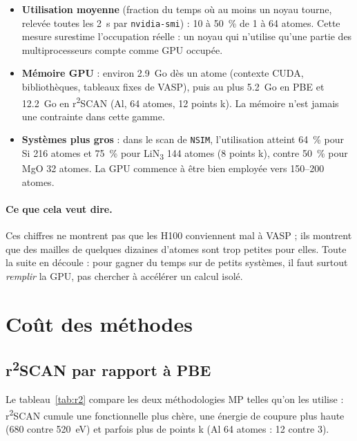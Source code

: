 \documentclass[11pt,a4paper]{article}
\newcommand{\rscan}{r\textsuperscript{2}SCAN}
\begin{document}
\begin{itemize}
  \item \textbf{Utilisation moyenne} (fraction du temps où au moins un noyau tourne, relevée
        toutes les \SI{2}{s} par \texttt{nvidia-smi}) : 10 à \SI{50}{\percent} de 1 à 64 atomes.
        Cette mesure surestime l'occupation réelle : un noyau qui n'utilise qu'une partie des
        multiprocesseurs compte comme \og GPU occupée\fg.
  \item \textbf{Mémoire GPU} : environ \SI{2,9}{Go} dès un atome (contexte CUDA, bibliothèques,
        tableaux fixes de VASP), puis au plus \SI{5,2}{Go} en PBE et \SI{12,2}{Go} en \rscan{}
        (Al, 64 atomes, 12 points k). La mémoire n'est jamais une contrainte dans cette gamme.
  \item \textbf{Systèmes plus gros} : dans le scan de \texttt{NSIM}, l'utilisation atteint
        \SI{64}{\percent} pour Si 216 atomes et \SI{75}{\percent} pour LiN\textsubscript{3}
        144 atomes (8 points k), contre \SI{50}{\percent} pour MgO 32 atomes. La GPU commence
        à être bien employée vers 150--200 atomes.
\end{itemize}

\paragraph{Ce que cela veut dire.} Ces chiffres ne montrent pas que les H100 conviennent mal à
VASP ; ils montrent que des mailles de quelques dizaines d'atomes sont trop petites pour elles.
Toute la suite en découle : pour gagner du temps sur de petits systèmes, il faut surtout
\emph{remplir} la GPU, pas chercher à accélérer un calcul isolé.

\section{Coût des méthodes}
\label{sec:cout}

\subsection{\rscan{} par rapport à PBE}

Le tableau~\ref{tab:r2} compare les deux méthodologies MP telles qu'on les utilise : \rscan{}
cumule une fonctionnelle plus chère, une énergie de coupure plus haute (680 contre
\SI{520}{eV}) et parfois plus de points k (Al 64 atomes : 12 contre 3).
\end{document}
